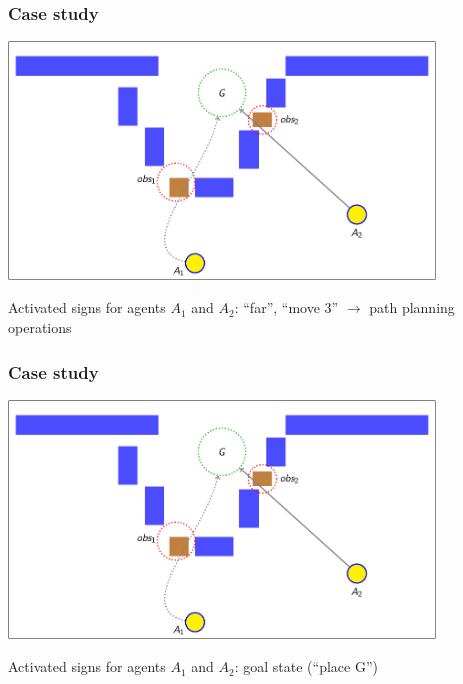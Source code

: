\documentclass[default]{beamer}
\begin{document}
	\begin{frame}
		\frametitle{Case study}
		
		\begin{center}
			\includegraphics[page=116,width=0.85\textwidth]{slides_colored}
		\end{center}
		\par\bigskip
		Activated signs for agents $A_1$ and $A_2$: ``far'', ``move 3'' $\rightarrow$ \color{red} path planning operations
	\end{frame}

	\begin{frame}
		\frametitle{Case study}
		
		\begin{center}
			\includegraphics[page=171,width=0.85\textwidth]{slides_colored}
		\end{center}
		\par\bigskip
		Activated signs for agents $A_1$ and $A_2$: goal state (``place G'')
	\end{frame}
					
\end{document}
